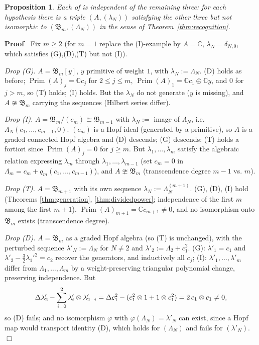\documentclass{article}
\newcommand{\assign}{:=}
\newcommand{\tmem}[1]{{\em #1\/}}
\newcommand{\tmop}[1]{\ensuremath{\operatorname{#1}}}
\newcommand{\tmtextup}[1]{\text{{\upshape{#1}}}}
\newenvironment{proof}{\noindent\textbf{Proof\ }}{\hspace*{\fill}$\Box$\medskip}
\newtheorem{proposition}{Proposition}
{\theorembodyfont{\rmfamily}\newtheorem{remark}{Remark}}
\newcommand{\Prim}{\tmop{Prim}}
\newcommand{\CA}{\mathfrak{B}}
\newcommand{\C}{\mathbb{C}}
\begin{document}
\begin{proposition}
  \label{prop:independence}Each of \tmtextup{(G), (D), (T), (I)} is
  independent of the remaining three: for each hypothesis there is a triple
  $(A, (\lambda_N))$ satisfying the other three but not isomorphic to $(\CA_m,
  (\Lambda_N))$ in the sense of Theorem~\ref{thm:recognition}.
\end{proposition}

\begin{proof}
  Fix $m \ge 2$ (for $m = 1$ replace the (I)-example by $A = \C$, $\lambda_N =
  \delta_{N, 0}$, which satisfies (G),(D),(T) but not (I)).
  
  {\tmem{Drop (G).}} $A = \CA_m [y]$, $y$ primitive of weight $1$, with
  $\lambda_N \assign \Lambda_N$. (D) holds as before; $\Prim (A)_j = \C c_j$
  for $2 \le j \le m$, $\Prim (A)_1 = \C c_1 \oplus \C y$, and $0$ for $j >
  m$, so (T) holds; (I) holds. But the $\lambda_N$ do not generate ($y$ is
  missing), and $A \ncong \CA_m$ carrying the sequences (Hilbert series
  differ).
  
  {\tmem{Drop (I).}} $A = \CA_m / (c_m) \cong \CA_{m - 1}$ with $\lambda_N
  \assign$ image of $\Lambda_N$, i.e. $\Lambda_N  (c_1, \ldots, c_{m - 1},
  0)$. $(c_m)$ is a Hopf ideal (generated by a primitive), so $A$ is a graded
  connected Hopf algebra and (D) descends; (G) descends; (T) holds a fortiori
  since $\Prim (A)_j = 0$ for $j \ge m$. But $\lambda_1, \ldots, \lambda_m$
  satisfy the algebraic relation expressing $\lambda_m$ through $\lambda_1,
  \ldots, \lambda_{m - 1}$ (set $c_m = 0$ in $\Lambda_m = c_m + q_m (c_1,
  \ldots, c_{m - 1})$), and $A \ncong \CA_m$ (transcendence degree $m - 1$ vs.
  $m$).
  
  {\tmem{Drop (T).}} $A = \CA_{m + 1}$ with its own sequence $\lambda_N
  \assign \Lambda^{(m + 1)}_N$. (G), (D), (I) hold (Theorems
  \ref{thm:generation}, \ref{thm:dividedpower}; independence of the first $m$
  among the first $m + 1$). $\Prim (A)_{m + 1} = \C c_{m + 1} \ne 0$, and no
  isomorphism onto $\CA_m$ exists (transcendence degree).
  
  {\tmem{Drop (D).}} $A = \CA_m$ as a graded Hopf algebra (so (T) is
  unchanged), with the perturbed sequence $\lambda'_N \assign \Lambda_N$ for
  $N \ne 2$ and $\lambda'_2 \assign \Lambda_2 + c_1^2$. (G): $\lambda'_1 =
  c_1$ and $\lambda'_2 - \tfrac{3}{2} {\lambda_1'}^2 = c_2$ recover the
  generators, and inductively all $c_j$; (I): $\lambda'_1, \ldots, \lambda'_m$
  differ from $\Lambda_1, \ldots, \Lambda_m$ by a weight-preserving triangular
  polynomial change, preserving independence. But
  \[ \Delta \lambda'_2 - \sum_{i = 0}^2 \lambda'_i \otimes \lambda'_{2 - i} =
     \Delta c_1^2 - (c_1^2 \otimes 1 + 1 \otimes c_1^2) = 2 \hspace{0.17em}
     c_1 \otimes c_1 \neq 0, \]
  so (D) fails; and no isomorphism $\varphi$ with $\varphi (\Lambda_N) =
  \lambda'_N$ can exist, since a Hopf map would transport identity (D), which
  holds for $(\Lambda_N)$ and fails for $(\lambda'_N)$.
\end{proof}
\end{document}
